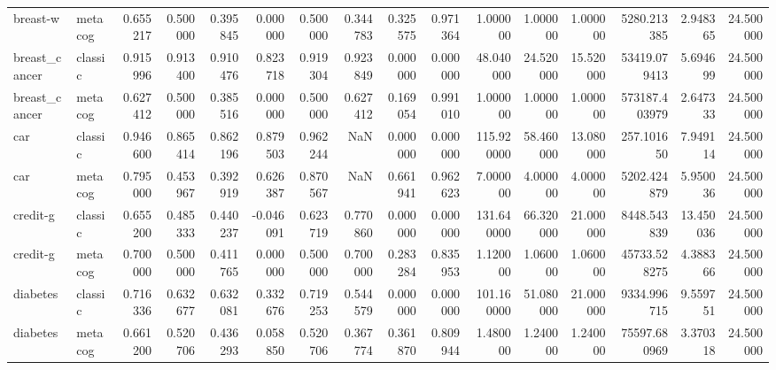 \begin{tabular}{llrrrrrrrrrrrrrr}
breast-w & metacog & 0.655217 & 0.500000 & 0.395845 & 0.000000 & 0.500000 & 0.344783 & 0.325575 & 0.971364 & 1.000000 & 1.000000 & 1.000000 & 5280.213385 & 2.948365 & 24.500000 \\
breast_cancer & classic & 0.915996 & 0.913400 & 0.910476 & 0.823718 & 0.919304 & 0.923849 & 0.000000 & 0.000000 & 48.040000 & 24.520000 & 15.520000 & 53419.079413 & 5.694699 & 24.500000 \\
breast_cancer & metacog & 0.627412 & 0.500000 & 0.385516 & 0.000000 & 0.500000 & 0.627412 & 0.169054 & 0.991010 & 1.000000 & 1.000000 & 1.000000 & 573187.403979 & 2.647333 & 24.500000 \\
car & classic & 0.946600 & 0.865414 & 0.862196 & 0.879503 & 0.962244 & NaN & 0.000000 & 0.000000 & 115.920000 & 58.460000 & 13.080000 & 257.101650 & 7.949114 & 24.500000 \\
car & metacog & 0.795000 & 0.453967 & 0.392919 & 0.626387 & 0.870567 & NaN & 0.661941 & 0.962623 & 7.000000 & 4.000000 & 4.000000 & 5202.424879 & 5.950036 & 24.500000 \\
credit-g & classic & 0.655200 & 0.485333 & 0.440237 & -0.046091 & 0.623719 & 0.770860 & 0.000000 & 0.000000 & 131.640000 & 66.320000 & 21.000000 & 8448.543839 & 13.450036 & 24.500000 \\
credit-g & metacog & 0.700000 & 0.500000 & 0.411765 & 0.000000 & 0.500000 & 0.700000 & 0.283284 & 0.835953 & 1.120000 & 1.060000 & 1.060000 & 45733.528275 & 4.388366 & 24.500000 \\
diabetes & classic & 0.716336 & 0.632677 & 0.632081 & 0.332676 & 0.719253 & 0.544579 & 0.000000 & 0.000000 & 101.160000 & 51.080000 & 21.000000 & 9334.996715 & 9.559751 & 24.500000 \\
diabetes & metacog & 0.661200 & 0.520706 & 0.436293 & 0.058850 & 0.520706 & 0.367774 & 0.361870 & 0.809944 & 1.480000 & 1.240000 & 1.240000 & 75597.680969 & 3.370318 & 24.500000 \\
\bottomrule
\end{tabular}
